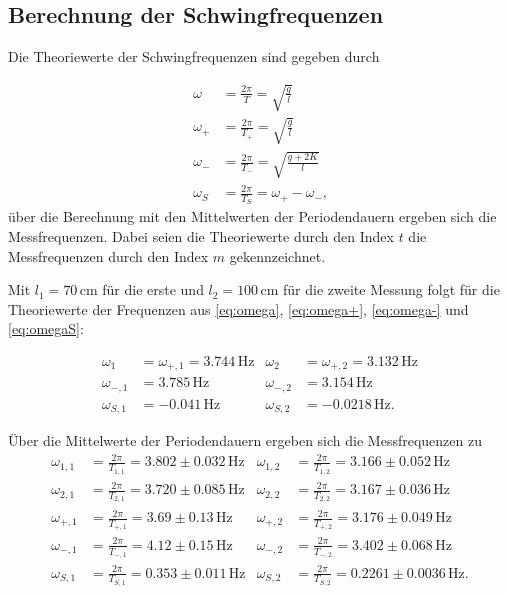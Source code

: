 \newpage

\subsection{Berechnung der Schwingfrequenzen}

Die Theoriewerte der Schwingfrequenzen sind gegeben durch

\begin{align}
  \omega   & = \frac{2π}{T}     =   \sqrt{\frac{g}{l}} \label{eq:omega} \\
  \omega_+ & = \frac{2π}{T_+} =   \sqrt{\frac{g}{l}} \label{eq:omega+} \\
  \omega_- & = \frac{2π}{T_-} =\sqrt{\frac{g+2K}{l}} \label{eq:omega-} \\
  \omega_S & = \frac{2π}{T_S} =  \omega_+ -\omega_- \label{eq:omegaS} \text{,}
\end{align}
über die Berechnung mit den Mittelwerten der Periodendauern ergeben sich die Messfrequenzen. Dabei seien die Theoriewerte durch den Index $t$
die Messfrequenzen durch den Index $m$ gekennzeichnet.

Mit $l_1=70 \, \unit{\centi\meter}$ für die erste und $l_2= 100 \, \unit{\centi\meter}$ für die zweite Messung folgt für die Theoriewerte der Frequenzen aus \eqref{eq:omega}, \eqref{eq:omega+}, \eqref{eq:omega-} und \eqref{eq:omegaS}:

\begin{align}
\omega_1 & = \omega_{+,1} = 3.744 \, \unit{\hertz}   & \omega_2 & = \omega_{+,2} = 3.132 \, \unit{\hertz} \nonumber\\
\omega_{-,1} & = 3.785            \, \unit{\hertz}   & \omega_{-,2} & = 3.154            \, \unit{\hertz} \nonumber \\
\omega_{S,1} & = -0.041           \, \unit{\hertz}   & \omega_{S,2} & = -0.0218          \, \unit{\hertz} \nonumber \text{.}
\end{align}

Über die Mittelwerte der Periodendauern ergeben sich die Messfrequenzen zu
\begin{align}
\omega_{1,1} & = \frac{2π}{T_{1,1}}   = 3.802 \pm 0.032     \,\unit{\hertz}& \omega_{1,2} & =  \frac{2π}{T_{1,2}}         = 3.166   \pm 0.052 \,\unit{\hertz}   \nonumber\\
\omega_{2,1} & = \frac{2π}{T_{2,1}}  = 3.720 \pm 0.085      \,\unit{\hertz}& \omega_{2,2} & =  \frac{2π}{T_{2,2}}         = 3.167   \pm 0.036 \,\unit{\hertz}   \nonumber\\
\omega_{+,1} & = \frac{2π}{T_{+,1}}  = 3.69 \pm 0.13        \,\unit{\hertz}& \omega_{+,2} & =  \frac{2π}{T_{+,2}}         = 3.176   \pm 0.049 \,\unit{\hertz}   \nonumber\\
\omega_{-,1} & = \frac{2π}{T_{-,1}}  = 4.12 \pm 0.15        \,\unit{\hertz}& \omega_{-,2} & =  \frac{2π}{T_{-,2}}         = 3.402   \pm 0.068 \,\unit{\hertz}   \nonumber\\
\omega_{S,1} & = \frac{2π}{T_{S,1}} = 0.353 \pm 0.011       \,\unit{\hertz}& \omega_{S,2} & =   \frac{2π}{T_{S,2}}        = 0.2261  \pm 0.0036 \,\unit{\hertz} \nonumber \text{.}
\end{align} 

